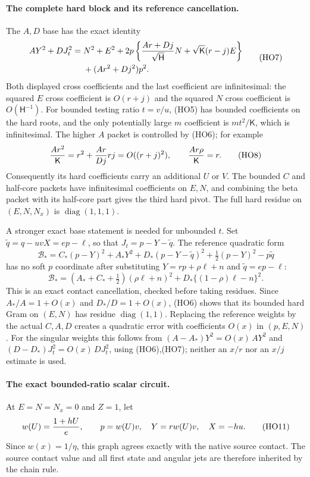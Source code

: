 \paragraph{The complete hard block and its reference cancellation.}
The $A,D$ base has the exact identity
\[
 \begin{split}
 AY^2+DJ_t^2={}&N^2+E^2
 +2p\left\{{Ar+Dj\over\sqrt{\mathsf H}}N
                 +\sqrt{\mathsf K}(r-j)E\right\}\\
 &+(Ar^2+Dj^2)p^2 .
 \end{split}
 \tag{HO7}
\]
Both displayed cross coefficients and the last coefficient are
infinitesimal: the squared $E$ cross coefficient is $O(r+j)$
and the squared $N$ cross coefficient is $O(\mathsf H^{-1})$.
For bounded testing ratio $t=v/u$, (HO5) has bounded coefficients
on the hard roots, and the only potentially large $m$ coefficient is
$mt^2/\mathsf K$, which is infinitesimal.
The higher $A$ packet is controlled by (HO6); for example
\[
 {Ar^2\over\mathsf K}=r^2+{Ar\over Dj}rj=O((r+j)^2),
 \qquad {Ar\rho\over\mathsf K}=r .
 \tag{HO8}
\]
Consequently its hard coefficients carry an additional $U$ or $V$.
The bounded $C$ and half-core packets have infinitesimal coefficients
on $E,N$, and combining the beta packet with its half-core part gives
the third hard pivot. The full hard residue on $(E,N,N_x)$ is
$\operatorname{diag}(1,1,1)$.

A stronger exact base statement is needed for unbounded $t$.
Set $\widetilde q=q-uvX=ep-\ell$, so that
$J_t=p-Y-\widetilde q$. The reference quadratic form
\[
 \mathcal B_*=
 C_*(p-Y)^2+A_*Y^2+D_*(p-Y-\widetilde q)^2
                    +\tfrac12(p-Y)^2-p\widetilde q
 \tag{HO9}
\]
has no soft $p$ coordinate after substituting
$Y=rp+\rho\ell+n$ and $\widetilde q=ep-\ell$:
\[
 \mathcal B_*=
 (A_*+C_*+\tfrac12)(\rho\ell+n)^2
                 +D_*\{(1-\rho)\ell-n\}^2 .
 \tag{HO10}
\]
This is an exact contact cancellation, checked before taking residues.
Since $A_*/A=1+O(x)$ and $D_*/D=1+O(x)$, (HO6) shows that
its bounded hard Gram on $(E,N)$ has residue $\operatorname{diag}(1,1)$.
Replacing the reference weights by the actual $C,A,D$ creates a
quadratic error with coefficients $O(x)$ in $(p,E,N)$.
For the singular weights this follows from
$(A-A_*)Y^2=O(x)\,AY^2$ and
$(D-D_*)J_t^2=O(x)\,DJ_t^2$, using (HO6),(HO7);
neither an $x/r$ nor an $x/j$ estimate is used.

\paragraph{The exact bounded-ratio scalar circuit.}
At $E=N=N_x=0$ and $Z=1$, let
\[
 w(U)={1+hU\over e},\qquad
 p=w(U)v,\quad Y=rw(U)v,\quad X=-hu .
 \tag{HO11}
\]
Since $w(x)=1/\eta$, this graph agrees exactly with the native
source contact. The source contact value and all first state and
angular jets are therefore inherited by the chain rule.


